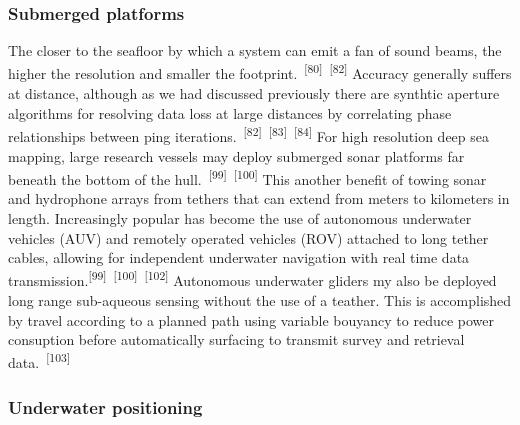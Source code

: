 \documentclass{article}
\begin{document}
\subsubsection{Submerged platforms}


\par{The closer to the seafloor by which a system can emit a fan of sound beams, the higher the resolution and smaller the footprint.~\textsuperscript{[80]}~\textsuperscript{[82]} Accuracy generally suffers at distance, although as we had discussed previously there are synthtic aperture algorithms for resolving data loss at large distances by correlating phase relationships between ping iterations.~\textsuperscript{[82]}~\textsuperscript{[83]}~\textsuperscript{[84]} For high resolution deep sea mapping, large research vessels may deploy submerged sonar platforms far beneath the bottom of the hull.~\textsuperscript{[99]}~\textsuperscript{[100]} This another benefit of towing sonar and hydrophone arrays from tethers that can extend from meters to kilometers in length. Increasingly popular has become the use of autonomous underwater vehicles (AUV) and remotely operated vehicles (ROV) attached to long tether cables, allowing for independent underwater navigation with real time data transmission.\textsuperscript{[99]}~\textsuperscript{[100]}~\textsuperscript{[102]} Autonomous underwater gliders my also be deployed long range sub-aqueous sensing without the use of a teather. This is accomplished by travel according to a planned path using variable bouyancy to reduce power consuption before automatically surfacing to transmit survey and retrieval data.~\textsuperscript{[103]}}


\subsubsection{Underwater positioning}

\end{document}
